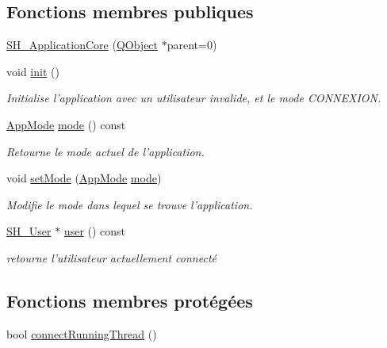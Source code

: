 \subsection*{Fonctions membres publiques}
\begin{DoxyCompactItemize}
\item 
\hyperlink{classSimpleHotel_1_1SH__ApplicationCore_a7ef76ea628508460593d93d8b449876b}{S\-H\-\_\-\-Application\-Core} (\hyperlink{classQObject}{Q\-Object} $\ast$parent=0)
\item 
void \hyperlink{classSimpleHotel_1_1SH__ApplicationCore_a3c4eb72fcd01013faf53714954995478}{init} ()
\begin{DoxyCompactList}\small\item\em Initialise l'application avec un utilisateur invalide, et le mode {\itshape C\-O\-N\-N\-E\-X\-I\-O\-N}. \end{DoxyCompactList}\item 
\hyperlink{classSimpleHotel_1_1SH__ApplicationCore_a5fea25d06c20cd22de5a2221c3a2dddc}{App\-Mode} \hyperlink{classSimpleHotel_1_1SH__ApplicationCore_a508c10bf5c106f265f314ee1c0e113ae}{mode} () const 
\begin{DoxyCompactList}\small\item\em Retourne le mode actuel de l'application. \end{DoxyCompactList}\item 
void \hyperlink{classSimpleHotel_1_1SH__ApplicationCore_a1661e9a56883ec760064066386b47bab}{set\-Mode} (\hyperlink{classSimpleHotel_1_1SH__ApplicationCore_a5fea25d06c20cd22de5a2221c3a2dddc}{App\-Mode} \hyperlink{classSimpleHotel_1_1SH__ApplicationCore_a508c10bf5c106f265f314ee1c0e113ae}{mode})
\begin{DoxyCompactList}\small\item\em Modifie le mode dans lequel se trouve l'application. \end{DoxyCompactList}\item 
\hyperlink{classSimpleHotel_1_1SH__User}{S\-H\-\_\-\-User} $\ast$ \hyperlink{classSimpleHotel_1_1SH__ApplicationCore_ada4d031ef3de48f7859495f57b13aad2}{user} () const 
\begin{DoxyCompactList}\small\item\em retourne l'utilisateur actuellement connecté \end{DoxyCompactList}\end{DoxyCompactItemize}
\subsection*{Fonctions membres protégées}
\begin{DoxyCompactItemize}
\item 
bool \hyperlink{classSimpleHotel_1_1SH__ApplicationCore_a9feff73abc592c9af8d8c50346680d1a}{connect\-Running\-Thread} ()
\end{DoxyCompactItemize}

